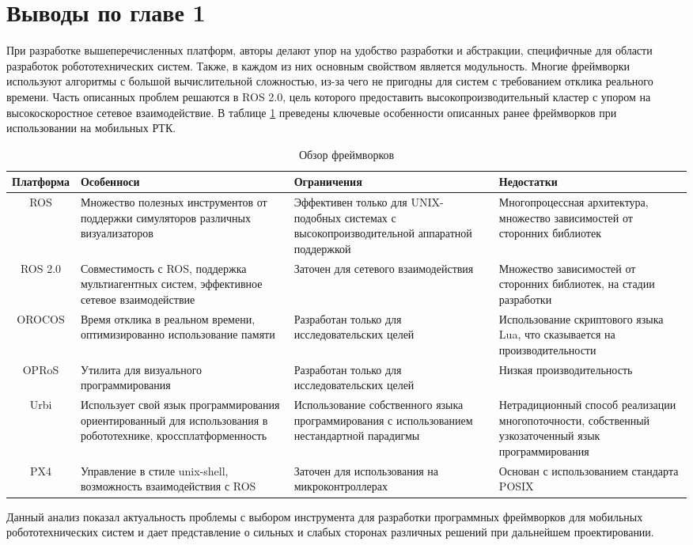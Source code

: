 \section*{Выводы по главе 1}

При разработке вышеперечисленных платформ, авторы делают упор на удобство разработки и абстракции, специфичные для области разработок робототехнических систем. Также, в каждом из них основным свойством является модульность. Многие фреймворки используют алгоритмы с большой вычислительной сложностью, из-за чего не пригодны для систем с требованием отклика реального времени. Часть описанных проблем решаются в ROS 2.0, цель которого предоставить высокопроизводительный кластер с упором на высокоскоростное сетевое взаимодействие. В таблице \ref{tab:frameworks} преведены ключевые особенности описанных ранее фреймворков при использовании на мобильных РТК.

\begin{table}
    \caption{\label{tab:frameworks}Обзор фреймворков}
    \begin{center}
        \begin{tabularx}{\textwidth}{|c|X|X|X|}
            \hline
            Платформа & Особенноси & Ограничения & Недостатки \\
            \hline
            ROS & Множество полезных инструментов от поддержки симуляторов различных визуализаторов & Эффективен только для UNIX-подобных системах с высокопроизводительной аппаратной поддержкой & Многопроцессная архитектура, множество зависимостей от сторонних библиотек \\
            \hline
            ROS 2.0 & Совместимость с ROS, поддержка мультиагентных систем, эффективное сетевое взаимодействие & Заточен для сетевого взаимодействия & Множество зависимостей от сторонних библиотек, на стадии разработки \\
            \hline
            OROCOS & Время отклика в реальном времени, оптимизированно использование памяти & Разработан только для исследовательских целей & Использование скриптового языка Lua, что сказывается на производительности \\
            \hline
            OPRoS & Утилита для визуального программирования & Разработан только для исследовательских целей & Низкая производительность \\
            \hline
            Urbi & Использует свой язык программирования ориентированный для использования в робототехнике, кроссплатформенность & Использование собственного языка программирования с использованием нестандартной парадигмы & Нетрадиционный способ реализации многопоточности, собственный узкозаточенный язык программирования \\
            \hline
            PX4 & Управление в стиле unix-shell, возможность взаимодействия с ROS & Заточен для использования на микроконтроллерах & Основан с использованием стандарта POSIX \\
            \hline
        \end{tabularx}
    \end{center}
\end{table}

Данный анализ показал актуальность проблемы с выбором инструмента для разработки программных фреймворков для мобильных робототехнических систем и дает представление о сильных и слабых сторонах различных решений при дальнейшем проектировании. 